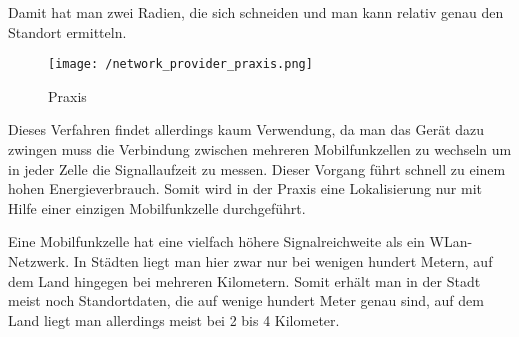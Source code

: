 Damit hat man zwei Radien, die sich schneiden und man kann relativ genau den Standort ermitteln. 

\begin{wrapfigure}{r}{43mm}
\centering
   \texttt{[image: /network\_provider\_praxis.png]} 
   \caption[Lokalisierung: NETWORK Provider in der Praxis]{Praxis}
\end{wrapfigure}

Dieses Verfahren findet allerdings kaum Verwendung, da man das Gerät dazu zwingen muss die Verbindung zwischen  mehreren Mobilfunkzellen zu wechseln um in jeder Zelle die Signallaufzeit zu messen. Dieser Vorgang führt schnell zu einem hohen Energieverbrauch.
Somit wird in der Praxis eine Lokalisierung nur mit Hilfe einer einzigen Mobilfunkzelle durchgeführt. 

Eine Mobilfunkzelle hat eine vielfach höhere Signalreichweite als ein WLan-Netzwerk. In Städten liegt man hier zwar nur bei wenigen hundert Metern, auf dem Land hingegen bei mehreren Kilometern. Somit erhält man in der Stadt meist noch Standortdaten, die auf wenige hundert Meter genau sind, auf dem Land liegt man allerdings meist bei 2 bis 4 Kilometer.

